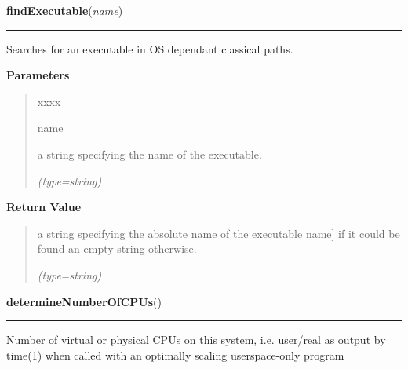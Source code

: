 \hspace{.8\funcindent}\begin{boxedminipage}{\funcwidth}

    \raggedright \textbf{findExecutable}(\textit{name})

    \vspace{-1.5ex}

    \rule{\textwidth}{0.5\fboxrule}
\setlength{\parskip}{2ex}
    Searches for an executable in OS dependant classical paths.

\setlength{\parskip}{1ex}
      \textbf{Parameters}
      \vspace{-1ex}

      \begin{quote}
        \begin{Ventry}{xxxx}

          \item[name]

          a string specifying the name of the executable.

            {\it (type=string)}

        \end{Ventry}

      \end{quote}

      \textbf{Return Value}
    \vspace{-1ex}

      \begin{quote}
      a string specifying the absolute name of the executable 
      {\textbar}name] if it could be found an empty string otherwise.

      {\it (type=string)}

      \end{quote}

    \end{boxedminipage}

    \label{nMOLDYN:Core:Misc:determineNumberOfCPUs}

    \vspace{0.5ex}

\hspace{.8\funcindent}\begin{boxedminipage}{\funcwidth}

    \raggedright \textbf{determineNumberOfCPUs}()

    \vspace{-1.5ex}

    \rule{\textwidth}{0.5\fboxrule}
\setlength{\parskip}{2ex}
    Number of virtual or physical CPUs on this system, i.e. user/real as 
    output by time(1) when called with an optimally scaling userspace-only 
    program

\setlength{\parskip}{1ex}
    \end{boxedminipage}

